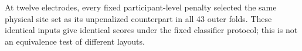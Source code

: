 At twelve electrodes, every fixed participant-level penalty selected the same physical site set as its unpenalized counterpart in all 43 outer folds. These identical inputs give identical scores under the fixed classifier protocol; this is not an equivalence test of different layouts.
